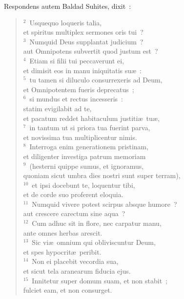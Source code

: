 \lettrine[lines=3,image=true,loversize=0.05,lraise=-0.03]{R}{}espondens autem Baldad Suhites, dixit~:
\begin{flushleft}\begin{verse}\vspace{6pt}${}^{2}$~Usquequo loqueris talia,\\ et spiritus multiplex sermones oris tui~?\\
${}^{3}$~Numquid Deus supplantat judicium~?\\ aut Omnipotens subvertit quod justum est~?\\
${}^{4}$~Etiam si filii tui peccaverunt ei,\\ et dimisit eos in manu iniquitatis su\ae~:\\
${}^{5}$~tu tamen si diluculo consurrexeris ad Deum,\\ et Omnipotentem fueris deprecatus~;\\
${}^{6}$~si mundus et rectus incesseris~:\\ statim evigilabit ad te,\\ et pacatum reddet habitaculum justiti\ae\ tu\ae ,\\
${}^{7}$~in tantum ut si priora tua fuerint parva,\\ et novissima tua multiplicentur nimis.\\
${}^{8}$~Interroga enim generationem pristinam,\\ et diligenter investiga patrum memoriam\\
${}^{9}$~(hesterni quippe sumus, et ignoramus,\\ quoniam sicut umbra dies nostri sunt super terram),\\
${}^{10}$~et ipsi docebunt te, loquentur tibi,\\ et de corde suo proferent eloquia.\\
${}^{11}$~Numquid vivere potest scirpus absque humore~?\\ aut crescere carectum sine aqua~?\\
${}^{12}$~Cum adhuc sit in flore, nec carpatur manu,\\ ante omnes herbas arescit.\\
${}^{13}$~Sic vi\ae\ omnium qui obliviscuntur Deum,\\ et spes hypocrit\ae\ peribit.\\
${}^{14}$~Non ei placebit vecordia sua,\\ et sicut tela aranearum fiducia ejus.\\
${}^{15}$~Innitetur super domum suam, et non stabit~;\\ fulciet eam, et non consurget.\\

\end{verse}
\end{flushleft}
